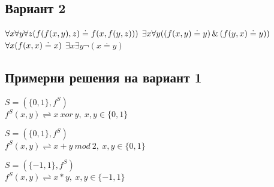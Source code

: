 \documentclass{article}
\begin{document}
\subsection{Вариант 2}

$\forall x\forall y\forall z (f(f(x,y),z) \doteq  f(x,f(y,z)))\\$
$\exists x \forall y ((f(x,y) \doteq y)\, \& \,(f(y,x) \doteq y))\\$
$\forall x(f(x,x) \doteq x) \\$
$\exists x \exists y \lnot( x \doteq y)$

\subsection{Примерни решения на вариант 1}
\begin{addmargin}[1em]{2em}
\begin{center}
$ S = ( \{0, 1\}, f^S)$ \\
$f^S(x,y)\rightleftharpoons x\ xor\ y ,\ x,y \in \{0, 1\}$
\end{center}
\end{addmargin}
\vskip 0.2in
\begin{addmargin}[1em]{2em}
\begin{center}
$ S = ( \{0, 1\}, f^S)$ \\
$f^S(x,y)\rightleftharpoons x+y\ mod\ 2 ,\ x,y \in \{0, 1\}$
\end{center}
\end{addmargin}
\vskip 0.2in
\begin{addmargin}[1em]{2em}
\begin{center}
$ S = ( \{-1, 1\}, f^S)$ \\
$f^S(x,y)\rightleftharpoons x*y ,\ x,y \in \{-1, 1\}$
\end{center}
\end{addmargin}
\end{document}
